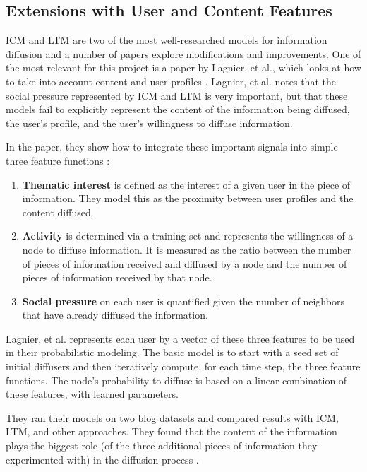 \subsection{Extensions with User and Content Features} \label{sec:usingusercontentfeatures}
ICM and LTM are two of the most well-researched models for information diffusion and a number of papers explore modifications and improvements.  One of the most relevant for this project is a paper by Lagnier, et al., which looks at how to take into account content and user profiles \cite{lagnier}.  Lagnier, et al. notes that the social pressure represented by ICM and LTM is very important, but that these models fail to explicitly represent the content of the information being diffused, the user's profile, and the user's willingness to diffuse information.

In the paper, they show how to integrate these important signals into simple three feature functions \cite{lagnier}:
\begin{enumerate}
	\item \textbf{Thematic interest} is defined as the interest of a given user in the piece of information.  They model this as the proximity between user profiles and the content diffused.
	\item \textbf{Activity} is determined via a training set and represents the willingness of a node to diffuse information.  It is measured as the ratio between the number of pieces of information received and diffused by a node and the number of pieces of information received by that node.
	\item \textbf{Social pressure} on each user is quantified given the number of neighbors that have already diffused the information.
\end{enumerate}
Lagnier, et al. represents each user by a vector of these three features to be used in their probabilistic modeling.  The basic model is to start with a seed set of initial diffusers and then iteratively compute, for each time step, the three feature functions.  The node's probability to diffuse is based on a linear combination of these features, with learned parameters.

They ran their models on two blog datasets and compared results with ICM, LTM, and other approaches.  They found that the content of the information plays the biggest role (of the three additional pieces of information they experimented with) in the diffusion process \cite{lagnier}.

